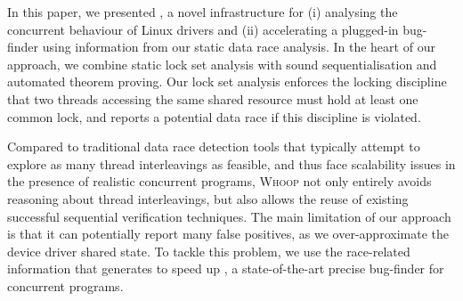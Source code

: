 In this paper, we presented \whoop, a novel infrastructure for (i) analysing the concurrent behaviour of Linux drivers and (ii) accelerating a plugged-in bug-finder using information from our static data race analysis. In the heart of our approach, we combine static lock set analysis with sound sequentialisation and automated theorem proving. Our lock set analysis enforces the locking discipline that two threads accessing the same shared resource must hold at least one common lock, and reports a potential data race if this discipline is violated.

Compared to traditional data race detection tools that typically attempt to explore as many thread interleavings as feasible, and thus face scalability issues in the presence of realistic concurrent programs, \textsc{Whoop} not only entirely avoids reasoning about thread interleavings, but also allows the reuse of existing successful sequential verification techniques. The main limitation of our approach is that it can potentially report many false positives, as we over-approximate the device driver shared state. To tackle this problem, we use the race-related information that \whoop generates to speed up \corral, a state-of-the-art precise bug-finder for concurrent programs.
